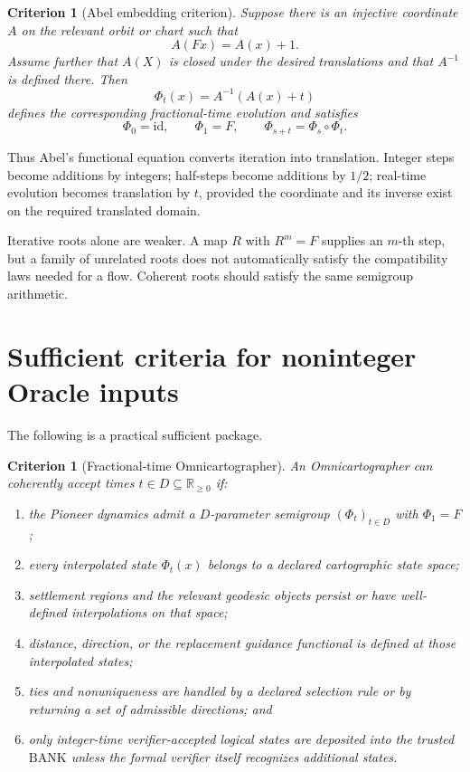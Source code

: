 \documentclass[11pt]{article}
\newtheorem{criterion}[theorem]{Criterion}
\newcommand{\BANK}{\mathrm{BANK}}
\newcommand{\Rge}{\mathbb{R}_{\ge 0}}
\begin{document}
\begin{criterion}[Abel embedding criterion]
Suppose there is an injective coordinate $A$ on the relevant orbit or chart such that
\[
A(Fx)=A(x)+1.
\]
Assume further that $A(X)$ is closed under the desired translations and that $A^{-1}$ is defined there. Then
\[
\Phi_t(x)=A^{-1}(A(x)+t)
\]
defines the corresponding fractional-time evolution and satisfies
\[
\Phi_0=\mathrm{id},\qquad \Phi_1=F,\qquad \Phi_{s+t}=\Phi_s\circ\Phi_t.
\]
\end{criterion}

Thus Abel's functional equation converts iteration into translation. Integer steps become additions by integers; half-steps become additions by $1/2$; real-time evolution becomes translation by $t$, provided the coordinate and its inverse exist on the required translated domain.

Iterative roots alone are weaker. A map $R$ with $R^m=F$ supplies an $m$-th step, but a family of unrelated roots does not automatically satisfy the compatibility laws needed for a flow. Coherent roots should satisfy the same semigroup arithmetic.

\section{Sufficient criteria for noninteger Oracle inputs}
The following is a practical sufficient package.

\begin{criterion}[Fractional-time Omnicartographer]
An Omnicartographer can coherently accept times $t\in D\subseteq\Rge$ if:
\begin{enumerate}[label=(\roman*)]
\item the Pioneer dynamics admit a $D$-parameter semigroup $(\Phi_t)_{t\in D}$ with $\Phi_1=F$;
\item every interpolated state $\Phi_t(x)$ belongs to a declared cartographic state space;
\item settlement regions and the relevant geodesic objects persist or have well-defined interpolations on that space;
\item distance, direction, or the replacement guidance functional is defined at those interpolated states;
\item ties and nonuniqueness are handled by a declared selection rule or by returning a set of admissible directions; and
\item only integer-time verifier-accepted logical states are deposited into the trusted $\BANK$ unless the formal verifier itself recognizes additional states.
\end{enumerate}
\end{criterion}
\end{document}
